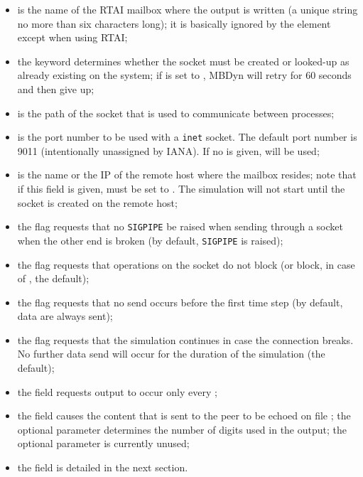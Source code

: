 \begin{itemize}
\item {} is the name of the RTAI mailbox where 
the output is written  (a unique string no more than six characters long);
it is basically ignored by the  element
except when using RTAI;

\item the  keyword determines whether the socket
must be created or looked-up as already existing on the system;
if  is set to , MBDyn will retry for 60 seconds
and then give up;

\item {} is the path of the  socket 
that is used to communicate between processes;

\item {} is the port number to be used with a \texttt{inet} socket.
The default port number is 9011 (intentionally unassigned by IANA).
If no  is given,  will be used;

\item {} is the name or the IP of the remote host where
the mailbox resides; note that if this field is given,  must
be set to .
The simulation will not start until the socket is created on the remote host;

\item the flag  requests that no \texttt{SIGPIPE} be raised
when sending through a socket when the other end is broken
(by default, \texttt{SIGPIPE} is raised);

\item the flag  requests that operations on the socket
do not block (or block, in case of , the default);

\item the flag  requests that no send occurs before
the first time step (by default, data are always sent);

\item the flag  requests that the simulation
continues in case the connection breaks.
No further data send will occur for the duration of the simulation
(the default);

\item the field  requests output to occur
only every ;

\item the field  causes the content that is sent to the peer
to be echoed on file ; the optional parameter 
determines the number of digits used in the output; the optional parameter
 is currently unused;

\item the field  is detailed in the next section.
\end{itemize}
